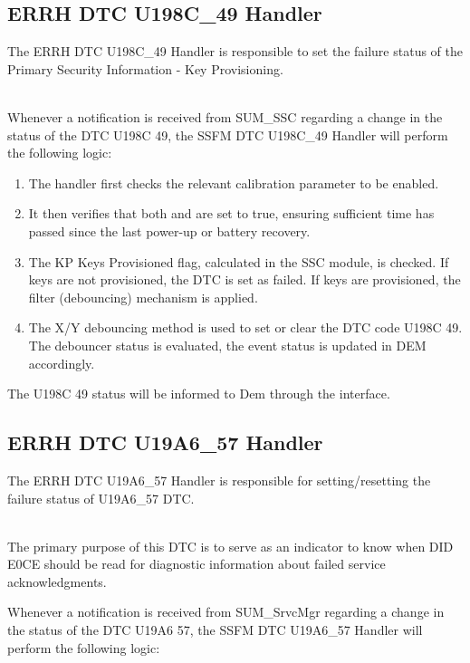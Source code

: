 \subsection{ERRH DTC U198C_49 Handler}
The ERRH DTC U198C_49 Handler is responsible to set the failure status of the Primary Security Information - Key Provisioning.

\\
Whenever a notification is received from SUM_SSC regarding a change in the status of the DTC U198C 49, the SSFM DTC U198C_49 Handler will perform the following logic:

\begin{enumerate}
    \item The handler first checks the relevant calibration parameter  to be enabled.
    \item It then verifies that both  and  are set to true, ensuring sufficient time has passed since the last power-up or battery recovery.
    \item The KP Keys Provisioned flag, calculated in the SSC module, is checked. If keys are not provisioned, the DTC is set as failed. If keys are provisioned, the filter (debouncing) mechanism is applied.
    \item The X/Y debouncing method is used to set or clear the DTC code U198C 49. The debouncer status is evaluated, the event status is updated in DEM accordingly.
\end{enumerate}

The U198C 49 status will be informed to Dem through the  interface.

{  }


\subsection{ERRH DTC U19A6_57 Handler}
The ERRH DTC U19A6_57 Handler is responsible for setting/resetting the failure status of U19A6_57 DTC.

\\
The primary purpose of this DTC is to serve as an indicator to know when DID E0CE should be read for diagnostic information about failed service acknowledgments.

Whenever a notification is received from SUM_SrvcMgr regarding a change in the status of the DTC U19A6 57, the SSFM DTC U19A6_57 Handler will perform the following logic:

